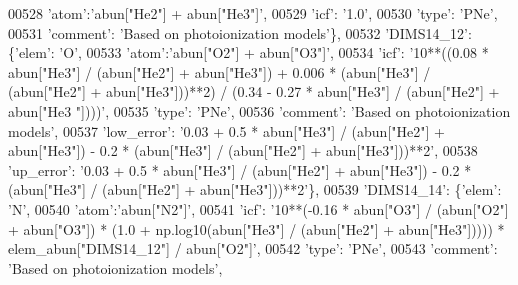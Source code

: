 \begin{DoxyCode}
00528                                        \textcolor{stringliteral}{'atom'}:\textcolor{stringliteral}{'abun["He2"] + abun["He3"]'}, 
00529                                        \textcolor{stringliteral}{'icf'}: \textcolor{stringliteral}{'1.0'},
00530                                        \textcolor{stringliteral}{'type'}: \textcolor{stringliteral}{'PNe'},
00531                                        \textcolor{stringliteral}{'comment'}: \textcolor{stringliteral}{'Based on photoionization models'}\},
00532                          \textcolor{stringliteral}{'DIMS14\_12'}: \{\textcolor{stringliteral}{'elem'}: \textcolor{stringliteral}{'O'},
00533                                        \textcolor{stringliteral}{'atom'}:\textcolor{stringliteral}{'abun["O2"] + abun["O3"]'}, 
00534                                        \textcolor{stringliteral}{'icf'}: \textcolor{stringliteral}{'10**((0.08 * abun["He3"] / (abun["He2"] + abun["He3"]) +
       0.006 * (abun["He3"] / (abun["He2"] + abun["He3"]))**2) / (0.34 - 0.27 * abun["He3"] / (abun["He2"] + abun["He3
      "])))'},
00535                                        \textcolor{stringliteral}{'type'}: \textcolor{stringliteral}{'PNe'},
00536                                        \textcolor{stringliteral}{'comment'}: \textcolor{stringliteral}{'Based on photoionization models'},
00537                                        \textcolor{stringliteral}{'low\_error'}: \textcolor{stringliteral}{'0.03 + 0.5 * abun["He3"] / (abun["He2"] + abun["He3"])
       - 0.2 * (abun["He3"] / (abun["He2"] + abun["He3"]))**2'},
00538                                        \textcolor{stringliteral}{'up\_error'}: \textcolor{stringliteral}{'0.03 + 0.5 * abun["He3"] / (abun["He2"] + abun["He3"])
       - 0.2 * (abun["He3"] / (abun["He2"] + abun["He3"]))**2'}\},
00539                          \textcolor{stringliteral}{'DIMS14\_14'}: \{\textcolor{stringliteral}{'elem'}: \textcolor{stringliteral}{'N'},
00540                                        \textcolor{stringliteral}{'atom'}:\textcolor{stringliteral}{'abun["N2"]'}, 
00541                                        \textcolor{stringliteral}{'icf'}: \textcolor{stringliteral}{'10**(-0.16 * abun["O3"] / (abun["O2"] + abun["O3"]) * (1.0 +
       np.log10(abun["He3"] / (abun["He2"] + abun["He3"])))) * elem\_abun["DIMS14\_12"] / abun["O2"]'},
00542                                        \textcolor{stringliteral}{'type'}: \textcolor{stringliteral}{'PNe'},
00543                                        \textcolor{stringliteral}{'comment'}: \textcolor{stringliteral}{'Based on photoionization models'},

\end{DoxyCode}

